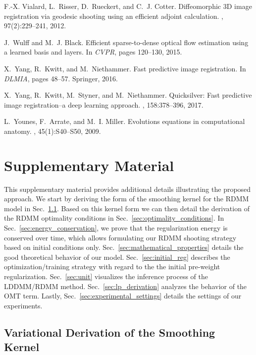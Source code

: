 \documentclass{article}
\numberwithin{equation}{section}
\begin{document}
{\begin{thebibliography}{10}
F.-X. Vialard, L.~Risser, D.~Rueckert, and C.~J. Cotter.
\newblock Diffeomorphic {3D} image registration via geodesic shooting using an
  efficient adjoint calculation.
, 97(2):229--241, 2012.

J.~Wulff and M.~J. Black.
\newblock Efficient sparse-to-dense optical flow estimation using a learned
  basis and layers.
\newblock In {\em CVPR}, pages 120--130, 2015.

X.~Yang, R.~Kwitt, and M.~Niethammer.
\newblock Fast predictive image registration.
\newblock In {\em DLMIA}, pages 48--57. Springer, 2016.

X.~Yang, R.~Kwitt, M.~Styner, and M.~Niethammer.
\newblock Quicksilver: Fast predictive image registration--a deep learning
  approach.
, 158:378--396, 2017.

L.~Younes, F.~Arrate, and M.~I. Miller.
\newblock Evolutions equations in computational anatomy.
, 45(1):S40--S50, 2009.

\end{thebibliography}
}
\newpage
\setcounter{page}{1}
\section{Supplementary Material}

     This supplementary material provides additional details illustrating the proposed approach. We start by deriving the form of the smoothing kernel for the RDMM model in Sec.~\ref{sec:kernel}. Based on this kernel form we can then detail the derivation of the RDMM optimality conditions in Sec.~\ref{sec:optimality_conditions}. In Sec.~\ref{sec:energy_conservation}, we prove that the regularization energy is conserved over time, which allows formulating our RDMM shooting strategy based on initial conditions only. Sec.~\ref{sec:mathematical_properties} details the good theoretical behavior of our model.
 Sec.~\ref{sec:initial_reg} describes the optimization/training strategy with regard to the the initial pre-weight regularization. Sec.~\ref{sec:unit} visualizes the inference process of the LDDMM/RDMM method. Sec.~\ref{sec:lp_derivation} analyzes the behavior of the OMT term. Lastly, Sec.~\ref{sec:experimental_settings} details the settings of our experiments.
 

\subsection{Variational Derivation of the Smoothing Kernel}
\label{sec:kernel}
\end{document}
